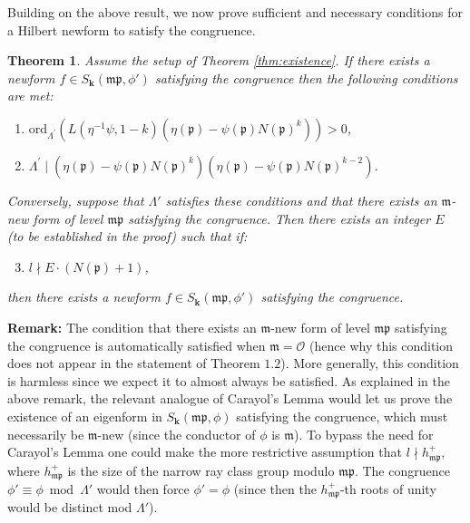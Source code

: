 \documentclass[a4paper,oneside]{amsart}
\theoremstyle{plain}
\newtheorem{thm}{Theorem}[section]
\theoremstyle{definition}
\begin{document}
\vspace{0.1in}
Building on the above result, we now prove sufficient and necessary conditions for a Hilbert newform to satisfy the congruence.
\begin{thm}
\label{thm:main}
    Assume the setup of Theorem \ref{thm:existence}. If there exists a newform $f\in S_{\textbf{k}}(\mathfrak{mp},\phi')$ satisfying the congruence then the following conditions are met: 
    \begin{enumerate}
        \item $\text{ord}_{\Lambda^\prime}(L(\eta^{-1}\psi, 1-k)(\eta(\mathfrak{p})-\psi(\mathfrak{p})N(\mathfrak{p})^k)) > 0$,
        \item $\Lambda^\prime \mid (\eta(\mathfrak{p})-\psi(\mathfrak{p})N(\mathfrak{p})^k)(\eta(\mathfrak{p})-\psi(\mathfrak{p})N(\mathfrak{p})^{k-2})$.
    \end{enumerate}
Conversely, suppose that $\Lambda'$ satisfies these conditions and that there exists an $\mathfrak{m}$-new form of level $\mathfrak{mp}$ satisfying the congruence. Then there exists an integer $E$ (to be established in the proof) such that if:
\begin{enumerate}\setcounter{enumi}{2}
        \item $l\nmid E\cdot(N(\mathfrak{p})+1)$,
    \end{enumerate}
    then there exists a newform $f\in S_{\textbf{k}}(\mathfrak{mp},\phi')$ satisfying the congruence.
\end{thm}

\vspace{0.1in}
\noindent \textbf{Remark:} The condition that there exists an $\mathfrak{m}$-new form of level $\mathfrak{mp}$ satisfying the congruence is automatically satisfied when $\mathfrak{m} = \mathcal{O}$ (hence why this condition does not appear in the statement of Theorem $1.2$). More generally, this condition is harmless since we expect it to almost always be satisfied. As explained in the above remark, the relevant analogue of Carayol's Lemma would let us prove the existence of an eigenform in $S_{\textbf{k}}(\mathfrak{mp},\phi)$ satisfying the congruence, which must necessarily be $\mathfrak{m}$-new (since the conductor of $\phi$ is $\mathfrak{m}$). To bypass the need for Carayol's Lemma one could make the more restrictive assumption that $l\nmid h_{\mathfrak{mp}}^+$, where $h_{\mathfrak{mp}}^+$ is the size of the narrow ray class group modulo $\mathfrak{mp}$. The congruence $\phi' \equiv \phi \bmod \Lambda'$ would then force $\phi' = \phi$ (since then the $h_{\mathfrak{mp}}^+$-th roots of unity would be distinct mod $\Lambda'$).
\end{document}

